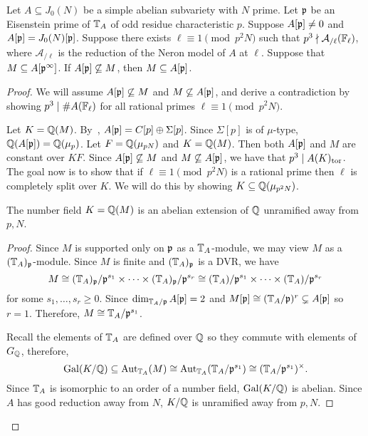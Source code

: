 \documentclass[thesis.tex]{subfiles}
\begin{document}
\begin{proposition}{{\cite[Prop. 4.5]{klosin-papikian:ribet}}}%
    \label{prop:eisenstein_cyclic}
    Let $A\subseteq J_0(N)$ be a simple abelian subvariety with $N$ prime. Let
    $\mathfrak{p}$ be an Eisenstein prime of $\mathbb{T}_A$ of odd residue characteristic $p$.
    Suppose $A[\mathfrak{p}]\neq 0$ and $A[\mathfrak{p}]=J_0(N)[\mathfrak{p}]$. Suppose there exists
    $\ell\equiv 1\pmod{p^2N}$ such that $p^3\nmid
    \mathcal{A}_{/\ell}(\mathbb{F}_\ell)$, where $\mathcal{A}_{/\ell}$ is the
    reduction of the Neron model of $A$ at $\ell$. Suppose that $M\subseteq
    A[\mathfrak{p}^\infty]$. If $A[\mathfrak{p}]\not\subseteq M$, then $M\subseteq A[\mathfrak{p}]$.
\end{proposition}
\begin{proof}
    We will assume $A[\mathfrak{p}]\not\subseteq M$ and $M\not\subseteq A[\mathfrak{p}]$, and
    derive a contradiction by showing $p^3\mid \#A(\mathbb{F}_\ell)$ for all rational
    primes $\ell \equiv 1\pmod{p^2N}$.

    Let $K=\mathbb{Q}(M)$. By~\cite[Cor. 16.3]{mazur:eisenstein}, $A[\mathfrak{p}]=C[p]\oplus
    \Sigma[p]$. Since $\Sigma[p]$ is of $\mu$-type, $\mathbb{Q}(A[\mathfrak{p}])=\mathbb{Q}(\mu_p)$.
    Let $F=\mathbb{Q}(\mu_{pN})$ and $K=\mathbb{Q}(M)$. Then both $A[\mathfrak{p}]$ and $M$ are
    constant over $KF$. Since $A[\mathfrak{p}]\not\subseteq M$ and $M\not\subseteq
    A[\mathfrak{p}]$, we have that $p^3\mid A(K)_{\mathrm{tor}}$. The goal now is to show that if
    $\ell\equiv 1\pmod{p^2N}$ is a rational prime then $\ell$ is completely
    split over $K$. We will do this by showing $K \subseteq \mathbb{Q}(\mu_{p^2 N})$.

    \begin{lemma}
        The number field $K=\mathbb{Q}(M)$ is an abelian extension of $\mathbb{Q}$ unramified
        away from $p, N$.
    \end{lemma}
    \begin{proof}
        Since $M$ is supported only on $\mathfrak{p}$ as a $\mathbb{T}_A$-module, we may view
        $M$ as a $(\mathbb{T}_A)_{\mathfrak{p}}$-module. Since $M$ is finite and $(\mathbb{T}_A)_{\mathfrak{p}}$ is a
        DVR\@, we have
        \[
            M\cong (\mathbb{T}_A)_{\mathfrak{p}} / \mathfrak{p}^{s_1} \times\cdots \times (\mathbb{T}_A)_{\mathfrak{p}} /
            \mathfrak{p}^{s_r}\cong (\mathbb{T}_A)/\mathfrak{p}^{s_1} \times \cdots \times
            (\mathbb{T}_A)/\mathfrak{p}^{s_r}
        \]
        for some $s_1,\ldots,s_r\geq 0$. Since $\dim_{\mathbb{T}_A/\mathfrak{p}} A[\mathfrak{p}]=2$ and
        $M[\mathfrak{p}]\cong (\mathbb{T}_A / \mathfrak{p})^r \subsetneq A[\mathfrak{p}]$ so $r=1$. Therefore,
        $M\cong \mathbb{T}_A/\mathfrak{p}^{s_1}$.

        Recall the elements of $\mathbb{T}_A$ are defined over $\mathbb{Q}$ so they commute
        with elements of $G_{\mathbb{Q}}$, therefore,
        \[
            \operatorname{Gal}(K/\mathbb{Q})\subseteq \operatorname{Aut}_{\mathbb{T}_A} (M) \cong \operatorname{Aut}_{\mathbb{T}_A}
            (\mathbb{T}_A/\mathfrak{p}^{s_1}) \cong (\mathbb{T}_A/\mathfrak{p}^{s_1})^\times.
        \]
        Since $\mathbb{T}_A$ is isomorphic to an order of a number field,
        $\operatorname{Gal}(K/\mathbb{Q})$ is abelian. Since $A$ has good reduction away from $N$,
        $K/\mathbb{Q}$ is unramified away from $p, N$.
    \end{proof}


\end{proof}
\end{document}
